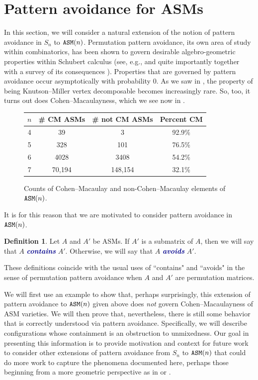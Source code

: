 \documentclass[12 pt]{amsart}
\DeclareMathOperator{\asm}{\tt ASM}
\theoremstyle{plain}
\theoremstyle{definition}
\newtheorem{definition}[thm]{Definition}
\theoremstyle{remark}
\newcommand{\newword}[1]{\textcolor{darkblue}{\textbf{\emph{#1}}}}
\begin{document}
{\section{Pattern avoidance for ASMs}

In this section, we will consider a natural extension of the notion of pattern avoidance in $S_n$ to $\asm(n)$. Permutation pattern avoidance, its own area of study within combinatorics, has been shown to govern desirable algebro-geometric properties within Schubert calculus (see, e.g., \cite{WY06, KMY09, Kle23} and quite importantly \cite{LS97} together with a survey of its consequences \cite{AB16}).  Properties that are governed by pattern avoidance occur asymptotically with probability $0$.  As we saw in , the property of being Knutson--Miller vertex decomposable becomes increasingly rare.  So, too, it turns out does Cohen--Macaulayness, which we see now in .

\begin{figure}[h]
\begin{center}
\begin{tabular}{|c|c|c|c|} 
 \hline
 $n$ & \# CM ASMs & \# not CM ASMs & Percent CM\\ 
 \hline
 4 & 39 & 3 & 92.9\% \\
 \hline
 5 & 328 & 101 & 76.5\%\\
 \hline
 6 & 4028 & 3408 & 54.2\% \\
 \hline
  7 & 70,194 & 148,154 & 32.1\%\\
 \hline
\end{tabular}
\caption{Counts of Cohen--Macaulay and non-Cohen--Macaulay elements of $\asm(n)$.}
\label{fig:CMData}
\end{center}
\end{figure}

It is for this reason that we are motivated to consider pattern avoidance in $\asm(n)$.

\begin{definition}\label{defn:contains} Let $A$ and $A'$ be ASMs.  If $A'$ is a submatrix of $A$, then we will say that $A$ \newword{contains} $A'$.  Otherwise, we will say that $A$ \newword{avoids} $A'$.  
\end{definition}

These definitions coincide with the usual uses of ``contains" and ``avoids" in the sense of permutation pattern avoidance when $A$ and $A'$ are permutation matrices.

We will first use an example to show that, perhaps surprisingly, this extension of pattern avoidance to $\asm(n)$ given above does \emph{not} govern Cohen--Macaulayness of ASM varieties.  We will then prove that, nevertheless, there is still some behavior that is correctly understood via pattern avoidance.  Specifically, we will describe configurations whose containment is an obstruction to unmixedness.  Our goal in presenting this information is to provide motivation and context for future work to consider other extensions of pattern avoidance from $S_n$ to $\asm(n)$ that could do more work to capture the phenomena documented here, perhaps those beginning from a more geometric perspective as in \cite{BB03} or \cite{BS98}.

}
\end{document}
